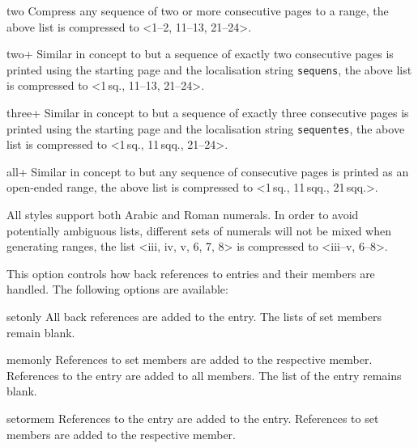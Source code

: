 \documentclass{ltxdockit}[2011/03/25]
\begin{document}
\begin{optionlist}
\begin{valuelist}
\item[two] Compress any sequence of two or more consecutive pages to a range, \eg the above list is compressed to <1--2, 11--13, 21--24>.

\item[two+] Similar in concept to  but a sequence of exactly two consecutive pages is printed using the starting page and the localisation string \texttt{sequens}, \eg the above list is compressed to <1\,sq., 11--13, 21--24>.

\item[three+] Similar in concept to  but a sequence of exactly three consecutive pages is printed using the starting page and the localisation string \texttt{sequentes}, \eg the above list is compressed to <1\,sq., 11\,sqq., 21--24>.

\item[all+] Similar in concept to  but any sequence of consecutive pages is printed as an open-ended range, \eg the above list is compressed to <1\,sq., 11\,sqq., 21\,sqq.>.

\end{valuelist}

All styles support both Arabic and Roman numerals. In order to avoid potentially ambiguous lists, different sets of numerals will not be mixed when generating ranges, \eg the list <iii, iv, v, 6, 7, 8> is compressed to <iii--v, 6--8>.


This option controls how back references to  entries and their members are handled. The following options are available:

\begin{valuelist}

\item[setonly] All back references are added to the  entry. The  lists of set members remain blank.

\item[memonly] References to set members are added to the respective member. References to the  entry are added to all members. The  list of the  entry remains blank.

\item[setormem] References to the  entry are added to the  entry. References to set members are added to the respective member.


\end{valuelist}
\end{optionlist}
\end{document}
